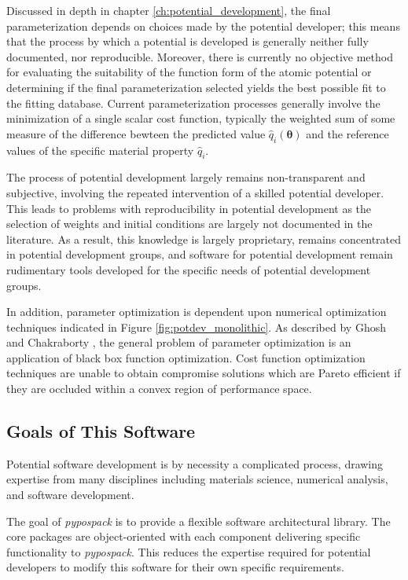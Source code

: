 Discussed in depth in chapter \ref{ch:potential_development}, the final parameterization depends on choices made by the potential developer; this means that the process by which a potential is developed is generally neither fully documented, nor reproducible.  Moreover, there is currently no objective method for evaluating the suitability of the function form of the atomic potential or determining if the final parameterization selected yields the best possible fit to the fitting database.  Current parameterization processes generally involve the minimization of a single scalar cost function, typically the weighted sum of some measure of the difference bewteen the predicted value $\hat{q}_i(\bm{\theta})$ and the reference values of the specific material property $\hat{q}_i$.

The process of potential development largely remains non-transparent and subjective\cite{martinez2013_fitting,martinez2016_posmat}, involving the repeated intervention of a skilled potential developer\cite{brenner2000_fitting}.
This leads to problems with reproducibility in potential development as the selection of weights and initial conditions are largely not documented in the literature.
As a result, this knowledge is largely proprietary, remains concentrated in potential development groups, and software for potential development remain rudimentary tools developed for the specific needs of potential development groups.

In addition, parameter optimization is dependent upon numerical optimization techniques indicated in Figure \ref{fig:potdev_monolithic}.  As described by Ghosh and Chakraborty \cite{ghosh2014_potdev_pareto}, the general problem of parameter optimization is an application of black box function optimization.  Cost function optimization techniques are unable to obtain compromise solutions which are Pareto efficient if they are occluded within a convex region of performance space.

\subsection{Goals of This Software}

Potential software development is by necessity a complicated process, drawing expertise from many disciplines including materials science, numerical analysis, and software development.

The goal of \emph{pypospack} is to provide a flexible software architectural library.  The core packages are object-oriented with each component delivering specific functionality to \emph{pypospack}.  This reduces the expertise required for potential developers to modify this software for their own specific requirements.

